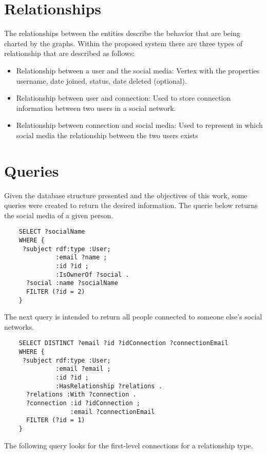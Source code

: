 \section{Relationships}

The relationships between the entities describe the behavior that are being charted by the graphs. Within the proposed system there are three types of relationship that are described as follows:

\begin{itemize}
    \item Relationship between a user and the social media: Vertex with the properties username, date joined, status, date deleted (optional).
    \item Relationship between user and connection: Used to store connection information between two users in a social network.
    \item Relationship between connection and social media: Used to represent in which social media the relationship between the two users exists
\end{itemize}


\section{Queries}

Given the database structure presented and the objectives of this work, some queries were created to return the desired information. 
The querie below returns the social media of a given person.
\begin{verbatim}
    SELECT ?socialName
    WHERE {
     ?subject rdf:type :User;
              :email ?name ;
              :id ?id ;
              :IsOwnerOf ?social .
      ?social :name ?socialName
      FILTER (?id = 2)
    }
\end{verbatim}


The next query is intended to return all people connected to someone else's social networks.

\begin{verbatim}
    SELECT DISTINCT ?email ?id ?idConnection ?connectionEmail
    WHERE {
     ?subject rdf:type :User;
              :email ?email ;
              :id ?id ;
              :HasRelationship ?relations .
      ?relations :With ?connection .
      ?connection :id ?idConnection ;
                  :email ?connectionEmail
      FILTER (?id = 1)
    }
\end{verbatim}

The following query looks for the first-level connections for a relationship type.

